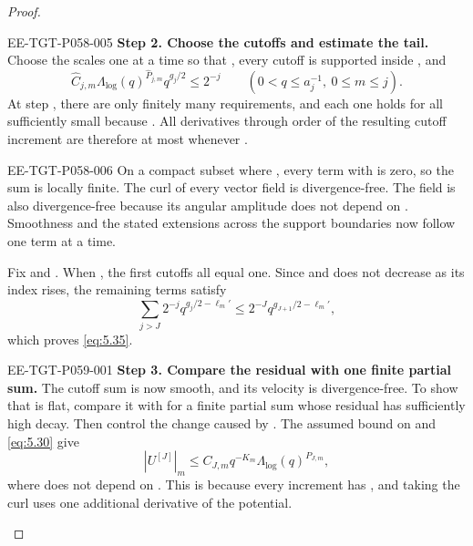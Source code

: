 \begin{proof}
\begin{EESegment}{EE-TGT-P058-005}
\textbf{Step 2. Choose the cutoffs and estimate the tail.}
Choose the scales  one at a time so that
, every cutoff  is supported inside
, and
\begin{equation}
 \widehat C_{j,m}\Lambda_{\log}(q)^{\widehat P_{j,m}}q^{g_j/2}
 \leq2^{-j}
 \qquad(0<q\leq a_j^{-1},\ 0\leq m\leq j).
 \tag{5.37}\label{eq:5.37}
\end{equation}
At step , there are only finitely many requirements, and each one holds for all sufficiently small
 because . All derivatives through order
 of the resulting cutoff increment are therefore at most
 whenever .
\end{EESegment}

\begin{EESegment}{EE-TGT-P058-006}
On a compact subset where , every term with
 is zero, so the sum is locally finite. The curl of every vector field is
divergence-free. The field  is also divergence-free because its angular amplitude does
not depend on . Smoothness and the stated extensions across the support boundaries now follow
one term at a time.

Fix  and . When
, the first  cutoffs all equal one. Since
 and  does not decrease as its index rises, the remaining terms satisfy
\[
 \sum_{j>J}2^{-j}q^{g_j/2-\ell_m'}
 \leq2^{-J}q^{g_{J+1}/2-\ell_m'},
\]
which proves \eqref{eq:5.35}.
\end{EESegment}

%
\begin{EESegment}{EE-TGT-P059-001}
\textbf{Step 3. Compare the residual with one finite partial sum.}
The cutoff sum  is now smooth, and its velocity is divergence-free. To show that
 is flat, compare it with  for a finite
partial sum whose residual has sufficiently high decay. Then control the change caused by
. The assumed bound on  and \eqref{eq:5.30} give
\begin{equation}
 |U^{[J]}|_m\leq C_{J,m}q^{-K_m}\Lambda_{\log}(q)^{P_{J,m}},
 \tag{5.38}\label{eq:5.38}
\end{equation}
where  does not depend on . This is because every increment has
, and taking the curl uses one additional derivative of the potential.
\end{EESegment}


\end{proof}
